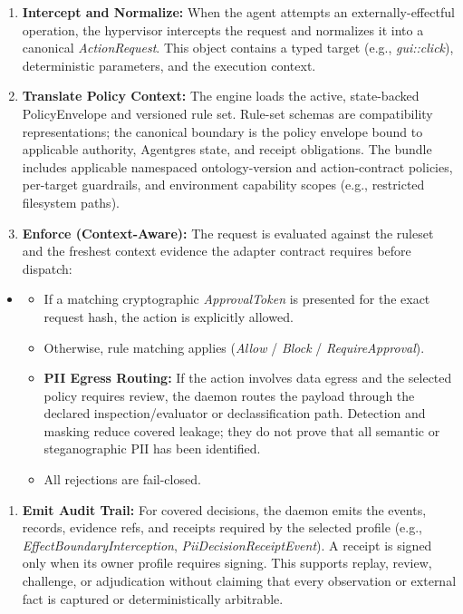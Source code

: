 \documentclass[
  11pt,
]{article}
\providecommand{\tightlist}{%
  \setlength{\itemsep}{0pt}\setlength{\parskip}{0pt}}
\begin{document}
\begin{enumerate}
\def\labelenumi{\arabic{enumi}.}
\tightlist
\item
  \textbf{Intercept and Normalize:} When the agent attempts an
  externally-effectful operation, the hypervisor intercepts the request
  and normalizes it into a canonical \emph{ActionRequest}. This object
  contains a typed target (e.g., \emph{gui::click}), deterministic
  parameters, and the execution context.
\item
  \textbf{Translate Policy Context:} The engine loads the active,
  state-backed PolicyEnvelope and versioned rule set. Rule-set schemas are
  compatibility representations; the canonical boundary is the policy
  envelope bound to applicable authority, Agentgres state, and receipt
  obligations. The bundle includes applicable namespaced ontology-version and
  action-contract policies,
  per-target guardrails, and environment capability scopes (e.g.,
  restricted filesystem paths).
\item
  \textbf{Enforce (Context-Aware):} The request is evaluated against the
  ruleset and the freshest context evidence the adapter contract requires
  before dispatch:
\end{enumerate}

\begin{itemize}
\item
  \begin{itemize}
  \tightlist
  \item
    If a matching cryptographic \emph{ApprovalToken} is presented for
    the exact request hash, the action is explicitly allowed.
  \item
    Otherwise, rule matching applies (\emph{Allow} / \emph{Block} /
    \emph{RequireApproval}).
  \item
    \textbf{PII Egress Routing:} If the action involves data egress and the
    selected policy requires review, the daemon routes the payload through the
    declared inspection/evaluator or declassification path. Detection and
    masking reduce covered leakage; they do not prove that all semantic or
    steganographic PII has been identified.
  \item
    All rejections are fail-closed.
  \end{itemize}
\end{itemize}

\begin{enumerate}
\def\labelenumi{\arabic{enumi}.}
\tightlist
\item
  \textbf{Emit Audit Trail:} For covered decisions, the daemon emits the events,
  records, evidence refs, and receipts required by the selected profile (e.g.,
  \emph{EffectBoundaryInterception}, \emph{PiiDecisionReceiptEvent}). A receipt
  is signed only when its owner profile requires signing. This supports replay,
  review, challenge, or adjudication without claiming that every observation or
  external fact is captured or deterministically arbitrable.
\end{enumerate}
\end{document}
